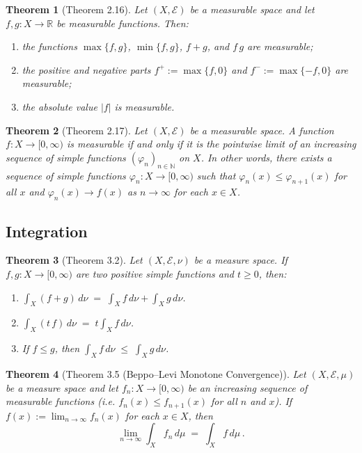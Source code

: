 \documentclass{article}
\theoremstyle{plain}
\newtheorem*{theorem*}{Theorem}
\begin{document}
\begin{theorem*}[Theorem 2.16]
Let $(X, \mathcal{E})$ be a measurable space and let $f, g: X \to \mathbb{R}$ be measurable functions. Then: 
\begin{enumerate}
\item the functions $\max\{f,g\}$, $\min\{f,g\}$, $f+g$, and $f\,g$ are measurable;
\item the positive and negative parts $f^+ := \max\{f,0\}$ and $f^- := \max\{-f,0\}$ are measurable;
\item the absolute value $|f|$ is measurable.
\end{enumerate}
\end{theorem*}

\begin{theorem*}[Theorem 2.17]
Let $(X, \mathcal{E})$ be a measurable space. A function $f: X \to [0,\infty)$ is measurable if and only if it is the pointwise limit of an increasing sequence of simple functions $(\varphi_n)_{n\in\mathbb{N}}$ on $X$. In other words, there exists a sequence of simple functions $\varphi_n: X\to[0,\infty)$ such that $\varphi_n(x) \le \varphi_{n+1}(x)$ for all $x$ and $\varphi_n(x) \to f(x)$ as $n\to\infty$ for each $x \in X$.
\end{theorem*}

\subsection*{Integration}
\begin{theorem*}[Theorem 3.2]
Let $(X, \mathcal{E}, \nu)$ be a measure space. If $f, g: X \to [0,\infty)$ are two positive simple functions and $t\ge 0$, then:
\begin{enumerate}[(1)]
\item $\displaystyle \int_X (f+g)\,d\nu \;=\; \int_X f\,d\nu + \int_X g\,d\nu$.
\item $\displaystyle \int_X (t\,f)\,d\nu \;=\; t \int_X f\,d\nu$.
\item If $f \le g$, then $\displaystyle \int_X f\,d\nu \;\le\; \int_X g\,d\nu$.
\end{enumerate}
\end{theorem*}

\begin{theorem*}[Theorem 3.5 (Beppo–Levi Monotone Convergence)]
Let $(X, \mathcal{E}, \mu)$ be a measure space and let $f_n: X \to [0,\infty)$ be an increasing sequence of measurable functions (i.e. $f_n(x)\le f_{n+1}(x)$ for all $n$ and $x$). If $f(x) := \lim_{n\to\infty} f_n(x)$ for each $x\in X$, then 
\[
\lim_{n\to\infty}\int_X f_n\,d\mu \;=\; \int_X f\,d\mu\,.
\] 
\end{theorem*}
\end{document}
